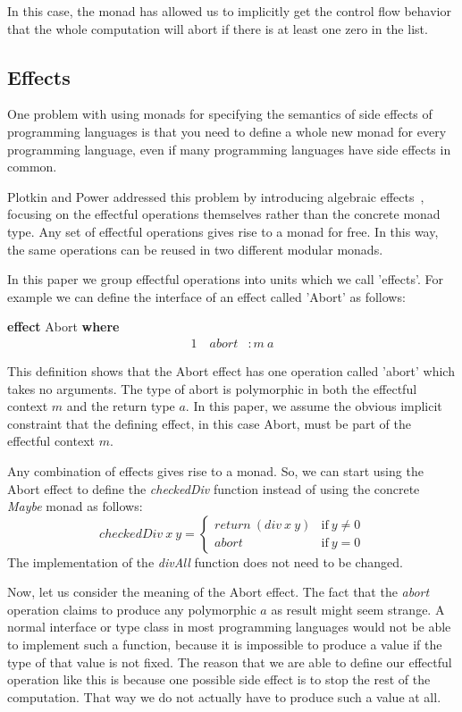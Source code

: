 \documentclass[a4paper,UKenglish,cleveref, autoref, thm-restate, anonymous]{oasics-v2021}
\begin{document}
In this case, the monad has allowed us to implicitly get the control flow behavior that the whole computation will abort if there is at least one zero in the list.

\subsection{Effects}

One problem with using monads for specifying the semantics of side effects of programming languages is that you need to define a whole new monad for every programming language, even if many programming languages have side effects in common.

Plotkin and Power addressed this problem by introducing algebraic effects~\cite{10.1007/3-540-45315-6_1}, focusing on the effectful operations themselves rather than the concrete monad type.
Any set of effectful operations gives rise to a monad for free.
In this way, the same operations can be reused in two different modular monads.

In this paper we group effectful operations into units which we call 'effects'. For example we can define the interface of an effect called 'Abort' as follows:

\vspace{1em}
\textbf{effect} Abort \textbf{where}
\vspace{-1em}
\begin{alignat*}{1}
  \quad\mathit{abort} & :  m~a
\end{alignat*}

This definition shows that the Abort effect has one operation called 'abort' which takes no arguments.
The type of abort is polymorphic in both the effectful context $m$ and the return type $a$.
In this paper, we assume the obvious implicit constraint that the defining effect, in this case Abort, must be part of the effectful context $m$.

Any combination of effects gives rise to a monad.
So, we can start using the Abort effect to define the \textit{checkedDiv} function instead of using the concrete \textit{Maybe} monad as follows:
\[
  \mathit{checkedDiv}~x~y = \begin{cases} 
    \mathit{return}~(\mathit{div}~x~y) & \text{if}~y \neq 0 \\
    \mathit{abort} & \text{if}~y = 0
  \end{cases}
\]
The implementation of the \textit{divAll} function does not need to be changed.

Now, let us consider the meaning of the Abort effect.
The fact that the \textit{abort} operation claims to produce any polymorphic $a$ as result might seem strange.
A normal interface or type class in most programming languages would not be able to implement such a function, because it is impossible to produce a value if the type of that value is not fixed.
The reason that we are able to define our effectful operation like this is because one possible side effect is to stop the rest of the computation.
That way we do not actually have to produce such a value at all.
\end{document}
